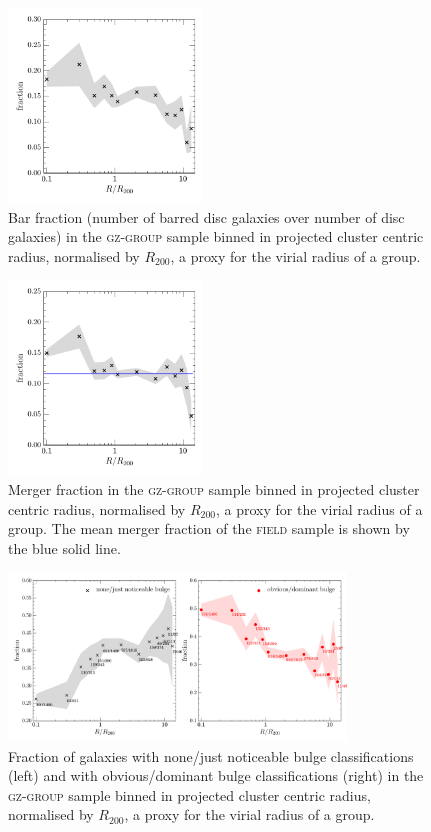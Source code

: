 \documentclass[useAMS,usenatbib]{mn2e}
\begin{document}
\begin{figure}
\includegraphics[width=0.46\textwidth]{bar_fraction_over_disc_trend_with_log_radius.pdf}
\caption{Bar fraction (number of barred disc galaxies over number of disc galaxies) in the \textsc{gz-group} sample binned in projected cluster centric radius, normalised by $R_{200}$, a proxy for the virial radius of a group.}
\label{fig:barradius}
\end{figure}

\begin{figure}
\includegraphics[width=0.46\textwidth]{merger_fraction_trend_with_log_radius_compare_field.pdf}
\caption{Merger fraction in the \textsc{gz-group} sample binned in projected cluster centric radius, normalised by $R_{200}$, a proxy for the virial radius of a group. The mean merger fraction of the \textsc{field} sample is shown by the blue solid line.}
\label{fig:mergerradius}
\end{figure}


\begin{figure}
\includegraphics[width=0.8\textwidth]{min_max_bulge_fraction_trend_with_log_radius.pdf}
\caption{Fraction of galaxies with none/just noticeable bulge classifications (left) and with obvious/dominant bulge classifications (right) in the \textsc{gz-group} sample binned in projected cluster centric radius, normalised by $R_{200}$, a proxy for the virial radius of a group.}
\label{fig:bulgeradius}
\end{figure}
\end{document}
